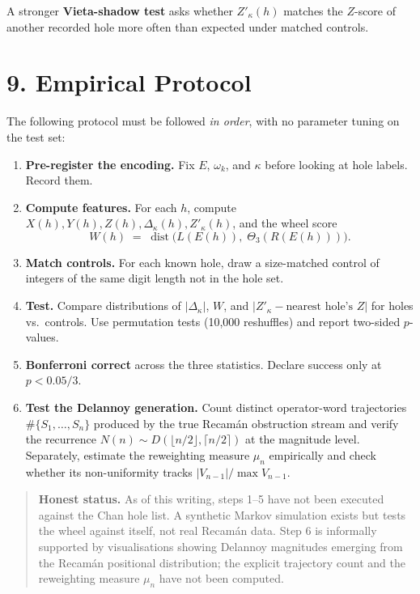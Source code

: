 \documentclass[
  11pt,
]{article}
\providecommand{\tightlist}{%
  \setlength{\itemsep}{0pt}\setlength{\parskip}{0pt}}
\begin{document}
A stronger \textbf{Vieta-shadow test} asks whether \(Z'_\kappa(h)\)
matches the \(Z\)-score of another recorded hole more often than
expected under matched controls.

\hypertarget{empirical-protocol}{%
\section{9. Empirical Protocol}\label{empirical-protocol}}

The following protocol must be followed \emph{in order}, with no
parameter tuning on the test set:

\begin{enumerate}
\def\labelenumi{\arabic{enumi}.}
\tightlist
\item
  \textbf{Pre-register the encoding.} Fix \(E\), \(\omega_k\), and
  \(\kappa\) before looking at hole labels. Record them.
\item
  \textbf{Compute features.} For each \(h\), compute
  \(X(h), Y(h), Z(h), \Delta_\kappa(h), Z'_\kappa(h)\), and the wheel
  score \[
  W(h) \;=\; \operatorname{dist}\!\bigl(L(E(h)),\; \Theta_3(R(E(h)))\bigr).
  \]
\item
  \textbf{Match controls.} For each known hole, draw a size-matched
  control of integers of the same digit length not in the hole set.
\item
  \textbf{Test.} Compare distributions of \(|\Delta_\kappa|\), \(W\),
  and \(|Z'_\kappa - \text{nearest hole's }Z|\) for holes vs.~controls.
  Use permutation tests (10,000 reshuffles) and report two-sided
  \(p\)-values.
\item
  \textbf{Bonferroni correct} across the three statistics. Declare
  success only at \(p < 0.05/3\).
\item
  \textbf{Test the Delannoy generation.} Count distinct operator-word
  trajectories \(\#\{S_1, \dots, S_n\}\) produced by the true Recamán
  obstruction stream and verify the recurrence
  \(N(n) \sim D(\lfloor n/2 \rfloor, \lceil n/2 \rceil)\) at the
  magnitude level. Separately, estimate the reweighting measure
  \(\mu_n\) empirically and check whether its non-uniformity tracks
  \(|V_{n-1}| / \max V_{n-1}\).
\end{enumerate}

\begin{quote}
\textbf{Honest status.} As of this writing, steps 1--5 have not been
executed against the Chan hole list. A synthetic Markov simulation
exists but tests the wheel against itself, not real Recamán data. Step 6
is informally supported by visualisations showing Delannoy magnitudes
emerging from the Recamán positional distribution; the explicit
trajectory count and the reweighting measure \(\mu_n\) have not been
computed.
\end{quote}
\end{document}
